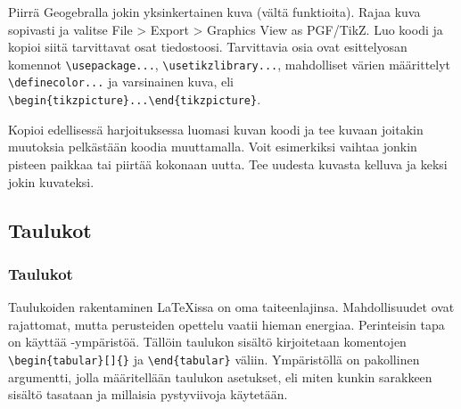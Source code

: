 \begin{fframe}
    \begin{harj}
    Piirrä Geogebralla jokin yksinkertainen kuva (vältä funktioita). Rajaa kuva sopivasti ja valitse File > Export > Graphics View as PGF/TikZ. Luo koodi ja kopioi siitä tarvittavat osat tiedostoosi. Tarvittavia osia ovat esittelyosan komennot \lstinline-\usepackage...-, \lstinline-\usetikzlibrary...-, mahdolliset värien määrittelyt \lstinline-\definecolor...- ja varsinainen kuva, eli \lstinline-\begin{tikzpicture}...\end{tikzpicture}-. 
    \end{harj}
    \begin{harj}
        \label{kelluvaTikz}
        Kopioi edellisessä harjoituksessa luomasi kuvan koodi ja tee kuvaan joitakin muutoksia pelkästään koodia muuttamalla. Voit esimerkiksi vaihtaa jonkin pisteen paikkaa tai piirtää kokonaan uutta. Tee uudesta kuvasta kelluva ja keksi jokin kuvateksi. 
    \end{harj}
\end{fframe}


\subsection{Taulukot}
\begin{fframe}
    \frametitle{Taulukot}
    Taulukoiden rakentaminen \LaTeX issa on oma taiteenlajinsa. Mahdollisuudet ovat rajattomat, mutta perusteiden opettelu vaatii hieman energiaa. 
    \pause
    \vaihto
Perinteisin tapa on käyttää -ympäristöä. Tällöin taulukon sisältö kirjoitetaan komentojen \lstinline-\begin{tabular}[]{}- ja \lstinline-\end{tabular}- väliin.
    \pause
    \vaihto
    Ympäristöllä on pakollinen argumentti, jolla määritellään taulukon asetukset, eli miten kunkin sarakkeen sisältö tasataan ja millaisia pystyviivoja käytetään.
\end{fframe}



